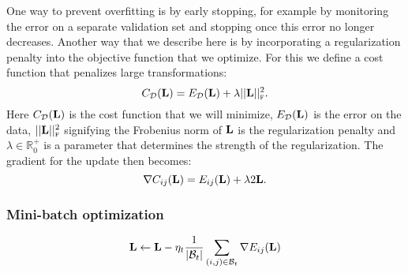 One way to prevent overfitting is by early stopping, for example by monitoring the error on a separate validation set and stopping once this error no longer decreases. Another way that we describe here is by incorporating a regularization penalty into the objective function that we optimize. For this we define a cost function that penalizes large transformations:
\begin{equation}
C_{\mathcal{D}}(\mathbf{L}) =  E_{\mathcal{D}}(\mathbf{L}) + \lambda ||\mathbf{L}||_\textsc{f}^2.
\label{eq:structured_risk}
\end{equation}
Here $C_{\mathcal{D}}(\mathbf{L})$ is the cost function that we will minimize, $E_{\mathcal{D}}(\mathbf{L})$ is the error on the data, $ ||\mathbf{L}||_\textsc{f}^2$ signifying the Frobenius norm of $\mathbf{L}$ is the regularization penalty and $\lambda \in \mathbb{R}_0^+$ is a parameter that determines the strength of the regularization. The gradient for the update then becomes:
\begin{equation}
\nabla C_{ij}(\mathbf{L}) =  E_{ij}(\mathbf{L}) + \lambda 2\mathbf{L}.
\label{eq:structured_grad}
\end{equation}


\subsubsection{Mini-batch optimization}


\begin{equation}
\mathbf{L} \leftarrow \mathbf{L} - \eta_{t} \frac{1}{|\mathcal{B}_t|} \sum_{(i,j) \in \mathcal{B}_t} \nabla E_{ij}(\mathbf{L})
\label{eq:update_batch}
\end{equation}






